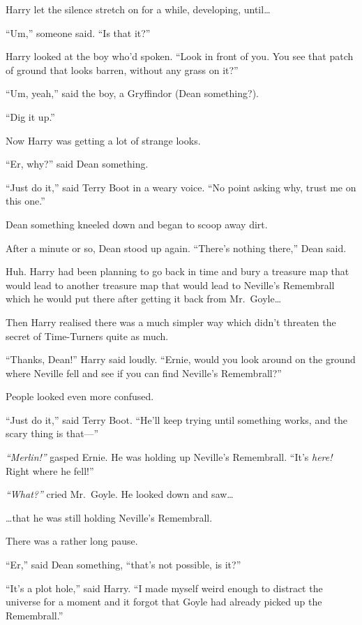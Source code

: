 Harry let the silence stretch on for a while, developing, until\ldots{}

``Um,'' someone said. ``Is that it?''

Harry looked at the boy who'd spoken. ``Look in front of you. You see
that patch of ground that looks barren, without any grass on it?''

``Um, yeah,'' said the boy, a Gryffindor (Dean something?).

``Dig it up.''

Now Harry was getting a lot of strange looks.

``Er, why?'' said Dean something.

``Just do it,'' said Terry Boot in a weary voice. ``No point asking why,
trust me on this one.''

Dean something kneeled down and began to scoop away dirt.

After a minute or so, Dean stood up again. ``There's nothing there,''
Dean said.

Huh. Harry had been planning to go back in time and bury a treasure map
that would lead to another treasure map that would lead to Neville's
Remembrall which he would put there after getting it back from
Mr.~Goyle\ldots{}

Then Harry realised there was a much simpler way which didn't threaten
the secret of Time-Turners quite as much.

``Thanks, Dean!'' Harry said loudly. ``Ernie, would you look around on
the ground where Neville fell and see if you can find Neville's
Remembrall?''

People looked even more confused.

``Just do it,'' said Terry Boot. ``He'll keep trying until something
works, and the scary thing is that---''

\emph{``Merlin!''} gasped Ernie. He was holding up Neville's Remembrall.
``It's \emph{here!} Right where he fell!''

\emph{``What?''} cried Mr.~Goyle. He looked down and saw\ldots{}

\ldots{}that he was still holding Neville's Remembrall.

There was a rather long pause.

``Er,'' said Dean something, ``that's not possible, is it?''

``It's a plot hole,'' said Harry. ``I made myself weird enough to
distract the universe for a moment and it forgot that Goyle had already
picked up the Remembrall.''

